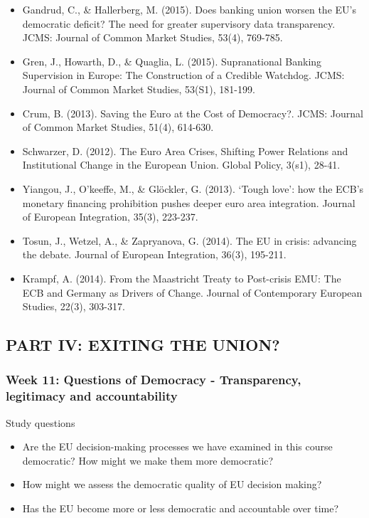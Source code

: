 \begin{itemize}
	\item Gandrud, C., \& Hallerberg, M. (2015). Does banking union worsen the EU's democratic deficit? The need for greater supervisory data transparency. JCMS: Journal of Common Market Studies, 53(4), 769-785.
	\item Gren, J., Howarth, D., \& Quaglia, L. (2015). Supranational Banking Supervision in Europe: The Construction of a Credible Watchdog. JCMS: Journal of Common Market Studies, 53(S1), 181-199.
	\item Crum, B. (2013). Saving the Euro at the Cost of Democracy?. JCMS: Journal of Common Market Studies, 51(4), 614-630.
	\item Schwarzer, D. (2012). The Euro Area Crises, Shifting Power Relations and Institutional Change in the European Union. Global Policy, 3(s1), 28-41.
	\item Yiangou, J., O’keeffe, M., \& Gl{\"o}ckler, G. (2013). ‘Tough love’: how the ECB’s monetary financing prohibition pushes deeper euro area integration. Journal of European Integration, 35(3), 223-237.
	\item Tosun, J., Wetzel, A., \& Zapryanova, G. (2014). The EU in crisis: advancing the debate. Journal of European Integration, 36(3), 195-211.
	\item Krampf, A. (2014). From the Maastricht Treaty to Post-crisis EMU: The ECB and Germany as Drivers of Change. Journal of Contemporary European Studies, 22(3), 303-317.
\end{itemize}


\subsection*{PART IV: EXITING THE UNION?}


\subsubsection*{Week 11: Questions of Democracy - Transparency, legitimacy and accountability}

Study questions

\begin{itemize}
	\item Are the EU decision-making processes we have examined in this course democratic? How might we make them more democratic?
	\item How might we assess the democratic quality of EU decision making?
	\item Has the EU become more or less democratic and accountable over time?
\end{itemize}

